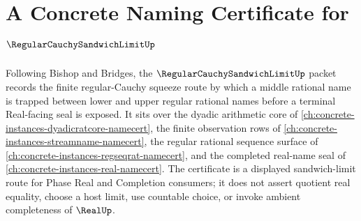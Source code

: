 \chapter{A Concrete Naming Certificate for $\RegularCauchySandwichLimitUp$}
\label{ch:concrete-instances-regular-cauchy-sandwich-limit-namecert}

Following Bishop and Bridges, the $\RegularCauchySandwichLimitUp$ packet records the finite regular-Cauchy squeeze route by which a middle rational name is trapped between lower and upper regular rational names before a terminal Real-facing seal is exposed. It sits over the dyadic arithmetic core of \autoref{ch:concrete-instances-dyadicratcore-namecert}, the finite observation rows of \autoref{ch:concrete-instances-streamname-namecert}, the regular rational sequence surface of \autoref{ch:concrete-instances-regseqrat-namecert}, and the completed real-name seal of \autoref{ch:concrete-instances-real-namecert}. The certificate is a displayed sandwich-limit route for Phase Real and Completion consumers; it does not assert quotient real equality, choose a host limit, use countable choice, or invoke ambient completeness of $\RealUp$.

